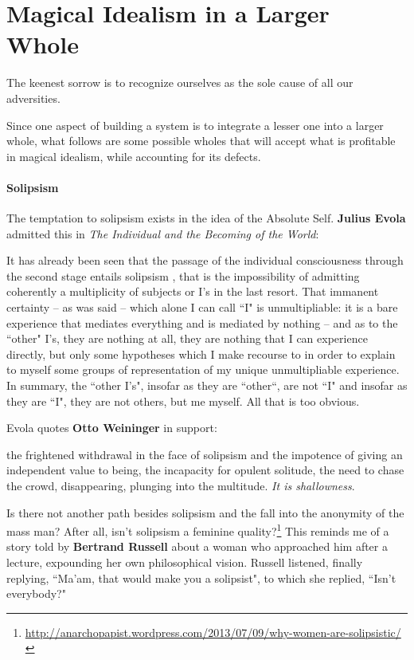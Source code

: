 \section{Magical Idealism in a Larger Whole}

\begin{quotex}
The keenest sorrow is to recognize ourselves as the sole cause of all our adversities. 

\end{quotex}
Since one aspect of building a system is to integrate a lesser one into a larger whole, what follows are some possible wholes that will accept what is profitable in magical idealism, while accounting for its defects.

\paragraph{Solipsism}
The temptation to solipsism exists in the idea of the Absolute Self. \textbf{Julius Evola} admitted this in \emph{The Individual and the Becoming of the World}:

\begin{quotex}
It has already been seen that the passage of the individual consciousness through the second stage entails solipsism , that is the impossibility of admitting coherently a multiplicity of subjects or I's in the last resort. That immanent certainty – as was said – which alone I can call ``I" is unmultipliable: it is a bare experience that mediates everything and is mediated by nothing – and as to the ``other" I's, they are nothing at all, they are nothing that I can experience directly, but only some hypotheses which I make recourse to in order to explain to myself some groups of representation of my unique unmultipliable experience. In summary, the ``other I's", insofar as they are ``other``, are not ``I" and insofar as they are ``I", they are not others, but me myself. All that is too obvious. 

\end{quotex}
Evola quotes \textbf{Otto Weininger} in support:

\begin{quotex}
the frightened withdrawal in the face of solipsism and the impotence of giving an independent value to being, the incapacity for opulent solitude, the need to chase the crowd, disappearing, plunging into the multitude. \emph{It is shallowness}. 

\end{quotex}
Is there not another path besides solipsism and the fall into the anonymity of the mass man? After all, isn't solipsism a feminine quality?\footnote{\url{http://anarchopapist.wordpress.com/2013/07/09/why-women-are-solipsistic/}} This reminds me of a story told by \textbf{Bertrand Russell} about a woman who approached him after a lecture, expounding her own philosophical vision. Russell listened, finally replying, ``Ma'am, that would make you a solipsist", to which she replied, ``Isn't everybody?"

